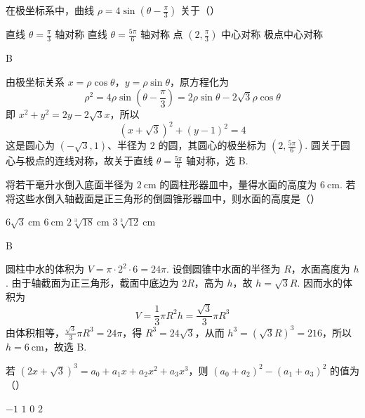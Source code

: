 \documentclass[UTF8,a4paper,oneside,11pt]{ctexbook}
\begin{document}
\begin{problem}
在极坐标系中，曲线 \(\rho=4\sin\left(\theta-\frac{\pi}{3}\right)\) 关于（\quad）

\choices
    {直线 \(\theta=\frac{\pi}{3}\) 轴对称}
    {直线 \(\theta=\frac{5\pi}{6}\) 轴对称}
    {点 \(\left(2,\frac{\pi}{3}\right)\) 中心对称}
    {极点中心对称}
\end{problem}

\begin{answer}
B
\end{answer}

\begin{solution}
由极坐标关系 \(x=\rho\cos\theta\)，\(y=\rho\sin\theta\)，原方程化为
\[
\rho^2=4\rho\sin\left(\theta-\frac{\pi}{3}\right)=2\rho\sin\theta-2\sqrt3\rho\cos\theta
\]
即
\(x^2+y^2=2y-2\sqrt3x\)，所以
\[
(x+\sqrt3)^2+(y-1)^2=4
\]
这是圆心为 \((-\sqrt3,1)\)、半径为 \(2\) 的圆，其圆心的极坐标为 \(\left(2,\frac{5\pi}{6}\right)\). 圆关于圆心与极点的连线对称，故关于直线 \(\theta=\frac{5\pi}{6}\) 轴对称，选 B.
\end{solution}

\begin{problem}
将若干毫升水倒入底面半径为 \(2\mathrm{~cm}\) 的圆柱形器皿中，量得水面的高度为 \(6\mathrm{~cm}\). 若将这些水倒入轴截面是正三角形的倒圆锥形器皿中，则水面的高度是（\quad）

\choices
    {\(6\sqrt{3}\mathrm{~cm}\)}
    {\(6\mathrm{~cm}\)}
    {\(2\sqrt[3]{18}\mathrm{~cm}\)}
    {\(3\sqrt[3]{12}\mathrm{~cm}\)}
\end{problem}

\begin{answer}
B
\end{answer}

\begin{solution}
圆柱中水的体积为
\(V=\pi\cdot 2^2\cdot 6=24\pi\). 设倒圆锥中水面的半径为 \(R\)，水面高度为 \(h\). 由于轴截面为正三角形，截面中底边为 \(2R\)，高为 \(h\)，故
\(h=\sqrt3R\). 因而水的体积为
\[
V=\frac13\pi R^2h=\frac{\sqrt3}{3}\pi R^3
\]
由体积相等，\(\frac{\sqrt3}{3}\pi R^3=24\pi\)，得 \(R^3=24\sqrt3\)，从而
\(h^3=(\sqrt3R)^3=216\)，所以 \(h=6\mathrm{~cm}\)，故选 B.
\end{solution}

\begin{problem}
若 \(\left(2x+\sqrt3\right)^3=a_0+a_1x+a_2x^2+a_3x^3\)，则 \((a_0+a_2)^2-(a_1+a_3)^2\) 的值为（\quad）

\choices
    {\(-1\)}
    {\(1\)}
    {\(0\)}
    {\(2\)}
\end{problem}
\end{document}
